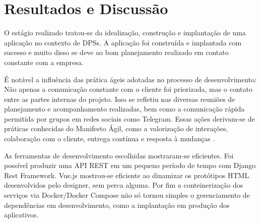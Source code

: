 \chapter[Resultados e Discussão]{Resultados e Discussão}
O estágio realizado tratou-se da idealização, construção e implantação de uma
aplicação no contexto de DPSs. A aplicação foi construída e implantada com
sucesso e muito disso se deve ao bom planejamento realizado em contato
constante com a empresa.

É notável a influência das prática ágeis adotadas no processo de
desenvolvimento: Não apenas a comunicação constante com o cliente foi
priorizada, mas o contato entre as partes internas do projeto. Isso se refletiu
nas diversas reuniões de planejamento e acompanhamento realizadas, bem como a
comunicação rápida permitida por grupos em redes sociais como Telegram. Essas
ações derivam-se de práticas conhecidas do Manifesto Ágil, como a valorização de
interações, colaboração com o cliente, entrega contínua e resposta à mudanças
\cite{beck2001agile}.

As ferramentas de desenvolvimento escolhidas mostraram-se eficientes. Foi possível produzir uma API REST em um pequeno período de tempo com Django Rest Framework. Vue.js mostrou-se eficiente ao dinamizar os protótipos HTML desenvolvidos pelo designer, sem perca alguma. Por fim a conteinerização dos serviços via Docker/Docker Compose não só tornou simples o gerenciamento de dependências em desenvolvimento, como a implantação em produção dos aplicativos.
